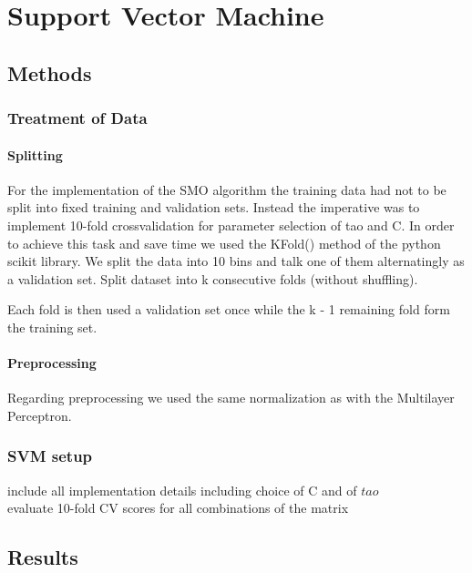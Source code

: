 \section{Support Vector Machine}

\subsection{Methods}

\subsubsection{Treatment of Data}

\paragraph{Splitting}
For the implementation of the SMO algorithm the training data had not to be split into fixed training and validation sets. Instead the imperative was to implement 10-fold crossvalidation for parameter selection of tao and C. In order to achieve this task and save time we used the KFold() method of the python scikit library. We split the data into 10 bins and talk one of them alternatingly as a validation set.
Split dataset into k consecutive folds (without shuffling).

Each fold is then used a validation set once while the k - 1 remaining fold form the training set.

\paragraph{Preprocessing}
Regarding preprocessing we used the same normalization as with the Multilayer Perceptron.

\subsubsection{SVM setup}
include all implementation details including choice of C and of $tao$\\
evaluate 10-fold CV scores for all combinations of the matrix

\subsection{Results}